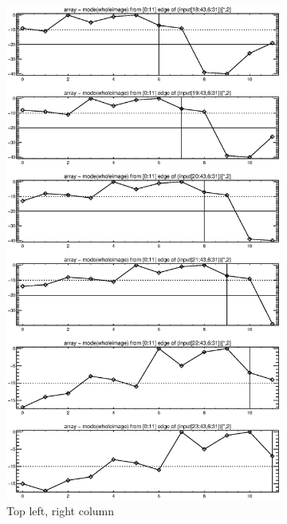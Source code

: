 \documentclass[10pt]{article}
\begin{document}
\begin{figure}[!h]
    \centering 
    \hspace{-1.0in}
    \begin{subfigure}[b]{.4\linewidth}
        \centering
        \includegraphics[width=1.4\textwidth]{../plots_tables_images/topright0.eps} 
        \caption{Top left, right column}
    \end{subfigure}
    \hspace{1.0in}
    \begin{subfigure}[b]{.4\linewidth}

\end{subfigure}
\end{figure}
\end{document}
